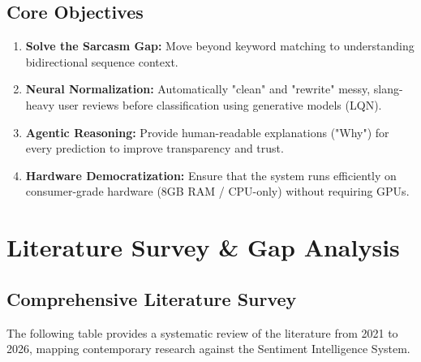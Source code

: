 \documentclass[11pt,oneside]{scrbook}
\begin{document}
\section{Core Objectives}
\begin{enumerate}
    \item \textbf{Solve the Sarcasm Gap:} Move beyond keyword matching to understanding bidirectional sequence context.
    \item \textbf{Neural Normalization:} Automatically "clean" and "rewrite" messy, slang-heavy user reviews before classification using generative models (LQN).
    \item \textbf{Agentic Reasoning:} Provide human-readable explanations ("Why") for every prediction to improve transparency and trust.
    \item \textbf{Hardware Democratization:} Ensure that the system runs efficiently on consumer-grade hardware (8GB RAM / CPU-only) without requiring GPUs.
\end{enumerate}
\cleardoublepage
\chapter{Literature Survey \& Gap Analysis}

\section{Comprehensive Literature Survey}
The following table provides a systematic review of the literature from 2021 to 2026, mapping contemporary research against the Sentiment Intelligence System.
\end{document}
